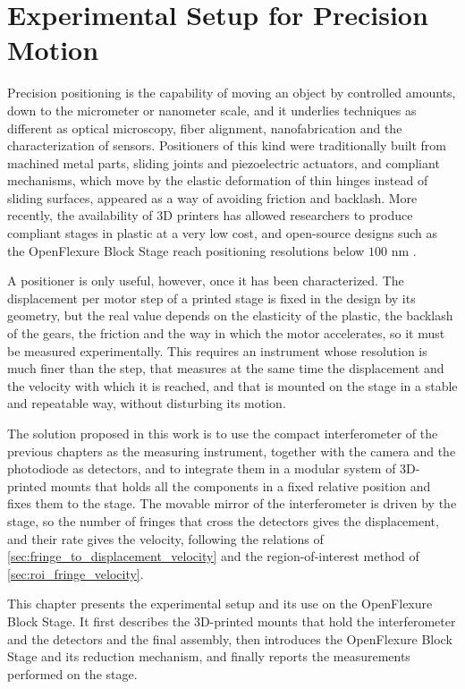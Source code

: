 \chapter{Experimental Setup for Precision Motion}

Precision positioning is the capability of moving an object by controlled amounts, down to the micrometer or nanometer scale, and it underlies techniques as different as optical microscopy, fiber alignment, nanofabrication and the characterization of sensors. Positioners of this kind were traditionally built from machined metal parts, sliding joints and piezoelectric actuators, and compliant mechanisms, which move by the elastic deformation of thin hinges instead of sliding surfaces, appeared as a way of avoiding friction and backlash. More recently, the availability of 3D printers has allowed researchers to produce compliant stages in plastic at a very low cost, and open-source designs such as the OpenFlexure Block Stage reach positioning resolutions below $100\text{ nm}$ \cite{mengOpenFlexureBlockStage2020, liaoDesignTestingCompliant2024, liaoLowcostOpensourceXYZ2022}.

A positioner is only useful, however, once it has been characterized. The displacement per motor step of a printed stage is fixed in the design by its geometry, but the real value depends on the elasticity of the plastic, the backlash of the gears, the friction and the way in which the motor accelerates, so it must be measured experimentally. This requires an instrument whose resolution is much finer than the step, that measures at the same time the displacement and the velocity with which it is reached, and that is mounted on the stage in a stable and repeatable way, without disturbing its motion.

The solution proposed in this work is to use the compact interferometer of the previous chapters as the measuring instrument, together with the camera and the photodiode as detectors, and to integrate them in a modular system of 3D-printed mounts that holds all the components in a fixed relative position and fixes them to the stage. The movable mirror of the interferometer is driven by the stage, so the number of fringes that cross the detectors gives the displacement, and their rate gives the velocity, following the relations of \cref{sec:fringe_to_displacement_velocity} and the region-of-interest method of \cref{sec:roi_fringe_velocity}.

This chapter presents the experimental setup and its use on the OpenFlexure Block Stage. It first describes the 3D-printed mounts that hold the interferometer and the detectors and the final assembly, then introduces the OpenFlexure Block Stage and its reduction mechanism, and finally reports the measurements performed on the stage.



